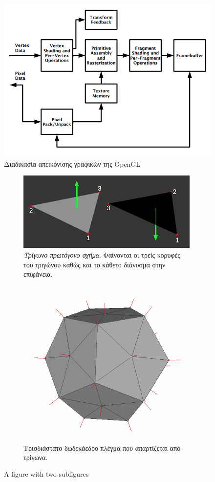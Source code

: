 \begin{figure}[t]
	\centering
	\includegraphics[scale=2.2]{images/chapter2/opengl_pipeline.jpg}
	\caption{Διαδικασία απεικόνισης γραφικών της OpenGL}
	\label{fig:opengl_pipeline}
\end{figure}

\begin{figure}
\label{fig:triangle_polyhedron_mesh}
\centering
\begin{subfigure}{.5\textwidth}
  \centering
  \includegraphics[width=.4\linewidth]{images/chapter2/triangle_normal.png}
  \caption[Τρίγωνο πρωτόγονο σχήμα]{\textsl{Τρίγωνο πρωτόγονο σχήμα}. Φαίνονται οι τρείς κορυφές του τριγώνου καθώς και το κάθετο διάνυσμα στην επιφάνεια.}
\end{subfigure}%
\begin{subfigure}{.5\textwidth}
\label{fig:dodecahedron}
  \centering
  \includegraphics[width=.4\linewidth]{images/appendix/vertex_normal.png}
  \caption[Τρισδιάστατο δωδεκάεδρο πλέγμα]{Τρισδιάστατο δωδεκάεδρο πλέγμα που απαρτίζεται από τρίγωνα.	}
\end{subfigure}
\caption{A figure with two subfigures}
\end{figure}


